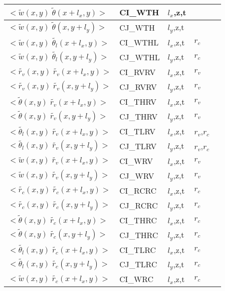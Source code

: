 \begin{longtable}[c]{|p{}|p{}|p{}|p{}|p{}|}
$<\tilde{w}(x,y)\;\tilde{\theta}(x+l_x,y)>$          & CI\_WTH   & $l_x$,z,t &             & \\\hline
$<\tilde{w}(x,y)\;\tilde{\theta}(x,y+l_y)>$          & CJ\_WTH   & $l_y$,z,t &             & \\\hline
$<\tilde{w}(x,y)\;\tilde{\theta_l}(x+l_x,y)>$        & CI\_WTHL  & $l_x$,z,t & $r_c$       & \\\hline
$<\tilde{w}(x,y)\;\tilde{\theta_l}(x,y+l_y)>$        & CJ\_WTHL  & $l_y$,z,t & $r_c$       & \\\hline
$<\tilde{r_v}(x,y)\;\tilde{r_v}(x+l_x,y)>$           & CI\_RVRV  & $l_x$,z,t & $r_v$       & \\\hline
$<\tilde{r_v}(x,y)\;\tilde{r_v}(x,y+l_y)>$           & CJ\_RVRV  & $l_y$,z,t & $r_v$       & \\\hline
$<\tilde{\theta}(x,y)\;\tilde{r_v}(x+l_x,y)>$        & CI\_THRV  & $l_x$,z,t & $r_v$       & \\\hline
$<\tilde{\theta}(x,y)\;\tilde{r_v}(x,y+l_y)>$        & CJ\_THRV  & $l_y$,z,t & $r_v$       & \\\hline
$<\tilde{\theta_l}(x,y)\;\tilde{r_v}(x+l_x,y)>$      & CI\_TLRV  & $l_x$,z,t & $r_v$,$r_c$ & \\\hline
$<\tilde{\theta_l}(x,y)\;\tilde{r_v}(x,y+l_y)>$      & CJ\_TLRV  & $l_y$,z,t & $r_v$,$r_c$ & \\\hline
$<\tilde{w}(x,y)\;\tilde{r_v}(x+l_x,y)>$             & CI\_WRV   & $l_x$,z,t & $r_v$       & \\\hline
$<\tilde{w}(x,y)\;\tilde{r_v}(x,y+l_y)>$             & CJ\_WRV   & $l_y$,z,t & $r_v$       & \\\hline
$<\tilde{r_c}(x,y)\;\tilde{r_c}(x+l_x,y)>$           & CI\_RCRC  & $l_x$,z,t & $r_c$       & \\\hline
$<\tilde{r_c}(x,y)\;\tilde{r_c}(x,y+l_y)>$           & CJ\_RCRC  & $l_y$,z,t & $r_c$       & \\\hline
$<\tilde{\theta}(x,y)\;\tilde{r_c}(x+l_x,y)>$        & CI\_THRC  & $l_x$,z,t & $r_c$       & \\\hline
$<\tilde{\theta}(x,y)\;\tilde{r_c}(x,y+l_y)>$        & CJ\_THRC  & $l_y$,z,t & $r_c$       & \\\hline
$<\tilde{\theta_l}(x,y)\;\tilde{r_c}(x+l_x,y)>$      & CI\_TLRC  & $l_x$,z,t & $r_c$       & \\\hline
$<\tilde{\theta_l}(x,y)\;\tilde{r_c}(x,y+l_y)>$      & CJ\_TLRC  & $l_y$,z,t & $r_c$       & \\\hline
$<\tilde{w}(x,y)\;\tilde{r_c}(x+l_x,y)>$             & CI\_WRC   & $l_x$,z,t & $r_c$       & \\\hline

\end{longtable}
